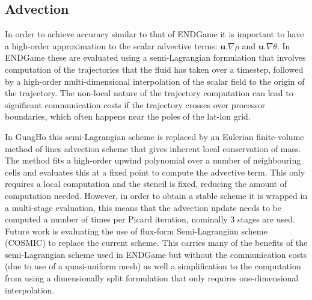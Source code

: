 \documentclass[review,times]{elsarticle}
\begin{document}
\subsection{Advection\label{sec:sub:advection}}
In order to achieve accuracy similar to that of ENDGame it is important to have 
a high-order approximation to the scalar advective terms: $\mathbf{u}.\nabla\rho$ 
and $\mathbf{u}.\nabla\theta$. In ENDGame these are evaluated using a 
semi-Lagrangian formulation that involves computation of the trajectories that 
the fluid has taken over a timestep, followed by a high-order multi-dimensional 
interpolation of the scalar field to the origin of the trajectory. 
The non-local nature of the trajectory computation can 
lead to significant communication costs if the trajectory crosses over processor 
boundaries, which often happens near the poles of the lat-lon grid.

In GungHo this semi-Lagrangian scheme is replaced by an Eulerian finite-volume 
method of lines advection scheme that gives inherent local conservation of mass.
The method fits a high-order upwind polynomial over a number of
neighbouring cells and evaluates this at a fixed point to compute the advective 
term. This only requires a local computation and the stencil is fixed, reducing the 
amount of computation needed. However, in order to obtain a stable scheme it is 
wrapped in a multi-stage evaluation, this means that the advection update needs to be 
computed a number of times per Picard iteration, nominally 3 stages are used. 
Future work is evaluating the use of flux-form Semi-Lagrangian scheme (COSMIC) 
\cite{Leonard1996} to replace the current scheme. This carries many of the 
benefits of the semi-Lagrangian scheme used in ENDGame but without the 
communication costs (due to use of a quasi-uniform mesh) as well a simplification 
to the computation from using a dimensionally split formulation that only requires 
one-dimensional interpolation.
\end{document}
